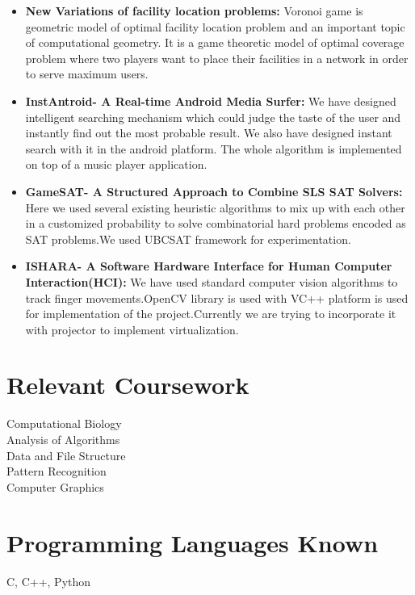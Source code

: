 \documentclass{res}
\begin{document}
\begin{resume}
\begin{itemize}
  \item {\bf New Variations of facility location problems:} Voronoi game is geometric model of optimal
  facility location problem and an important topic of computational geometry. It is a game
  theoretic model of optimal coverage problem where two players want to place their facilities
  in a network in order to serve maximum users.
  
  \item {\bf InstAntroid- A Real-time Android Media Surfer:} We have designed intelligent searching
  mechanism which could judge the taste of the user and instantly find out the most probable
  result. We also have designed instant search with it in the android platform. The whole
  algorithm is implemented on top of a music player application.
  
  \item 
 {\bf GameSAT- A Structured Approach to Combine SLS SAT Solvers:} Here we used several existing heuristic algorithms to mix up with each other in a customized probability to solve combinatorial hard problems encoded as SAT problems.We used UBCSAT framework for experimentation.
  
 \item {\bf ISHARA- A Software Hardware Interface for Human Computer Interaction(HCI):} We have used standard computer vision algorithms to track finger movements.OpenCV library is used with VC++ platform is used for implementation of the project.Currently we are trying to incorporate it with projector to implement virtualization. 
 

\end{itemize}           


\section{Relevant Coursework } 
Computational Biology\\
Analysis of Algorithms\\
Data and File Structure\\
Pattern Recognition\\
Computer Graphics\\
 
\section{\bf Programming Languages Known}          
  C, C++, Python\\ 


\end{resume}
\end{document}
